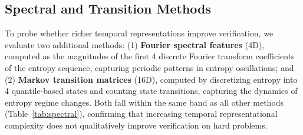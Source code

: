 \documentclass{article}
\begin{document}
\begin{table}[t]
\centering
\caption{Direction-flip rate and DA AUROC on hard BigMath problems (64 runs).}
\label{tab:fliprate}
\end{table}

\subsection{Spectral and Transition Methods}
\label{app:spectral}

To probe whether richer temporal representations improve verification, we evaluate two additional methods: (1) \textbf{Fourier spectral features} (4D), computed as the magnitudes of the first 4 discrete Fourier transform coefficients of the entropy sequence, capturing periodic patterns in entropy oscillations; and (2) \textbf{Markov transition matrices} (16D), computed by discretizing entropy into 4 quantile-based states and counting state transitions, capturing the dynamics of entropy regime changes. Both fall within the same band as all other methods (Table~\ref{tab:spectral}), confirming that increasing temporal representational complexity does not qualitatively improve verification on hard problems.
\end{document}
